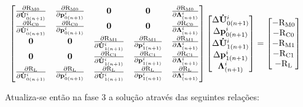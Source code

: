 \documentclass[tese_patricia]{subfiles}
\begin{document}
\begin{align}
	\begin{bmatrix}
		\frac{\partial\mathrm{R}_\mathrm{M0}}{\partial\mathbf{\dot{U}}_{0(n+1)}^{i}} & \frac{\partial\mathrm{R}_\mathrm{M0}}{\partial\mathbf{p}_{0(n+1)}^{i}} & \mathbf{0} & \mathbf{0} & \frac{\partial\mathrm{R}_\mathrm{M0}}{\partial\boldsymbol{\Lambda}_{(n+1)}^{i}} \\
		\frac{\partial\mathrm{R}_\mathrm{C0}}{\partial\mathbf{\dot{U}}_{0(n+1)}^{i}} & \frac{\partial\mathrm{R}_\mathrm{C0}}{\partial\mathbf{p}_{0(n+1)}^{i}} & \mathbf{0} & \mathbf{0} & \frac{\partial\mathrm{R}_\mathrm{C0}}{\partial\boldsymbol{\Lambda}_{(n+1)}^{i}} \\
		 \mathbf{0} & \mathbf{0} & \frac{\partial\mathrm{R}_\mathrm{M1}}{\partial\mathbf{\dot{U}}_{1(n+1)}^{i}} & \frac{\partial\mathrm{R}_\mathrm{M1}}{\partial\mathbf{p}_{1(n+1)}^{i}} & \frac{\partial\mathrm{R}_\mathrm{M1}}{\partial\boldsymbol{\Lambda}_{(n+1)}^{i}} \\
		 \mathbf{0} & \mathbf{0} & \frac{\partial\mathrm{R}_\mathrm{C1}}{\partial\mathbf{\dot{U}}_{1(n+1)}^{i}} & \frac{\partial\mathrm{R}_\mathrm{C1}}{\partial\mathbf{p}_{1(n+1)}^{i}} & \frac{\partial\mathrm{R}_\mathrm{C1}}{\partial\boldsymbol{\Lambda}_{(n+1)}^{i}} \\
		  \frac{\partial\mathrm{R}_\mathrm{L}}{\partial\mathbf{\dot{U}}_{0(n+1)}^{i}} & \frac{\partial\mathrm{R}_\mathrm{L}}{\partial\mathbf{p}_{0(n+1)}^{i}} & \frac{\partial\mathrm{R}_\mathrm{L}}{\partial\mathbf{\dot{U}}_{1(n+1)}^{i}} & \frac{\partial\mathrm{R}_\mathrm{L}}{\partial\mathbf{p}_{1(n+1)}^{i}} & \frac{\partial\mathrm{R}_\mathrm{L}}{\partial\boldsymbol{\Lambda}_{(n+1)}^{i}}
	\end{bmatrix}
	\begin{bmatrix}
		\Delta\mathbf{\dot{U}}_{0(n+1)}^{i} \\
		\Delta\mathbf{p}_{0(n+1)}^{i} \\
		\Delta\mathbf{\dot{U}}_{1(n+1)}^{i} \\
		\Delta\mathbf{p}_{1(n+1)}^{i} \\
		\boldsymbol{\Lambda}_{(n+1)}^{i}
	\end{bmatrix}
	&=
	\begin{bmatrix}
		-\mathrm{R}_\mathrm{M0} \\
		-\mathrm{R}_\mathrm{C0} \\
		-\mathrm{R}_\mathrm{M1} \\
		-\mathrm{R}_\mathrm{C1} \\
		-\mathrm{R}_\mathrm{L}
	\end{bmatrix}
	\label{eq:sistema_linear_Arlq}
\end{align}	

Atualiza-se então na fase 3 a solução através das seguintes relações:
\end{document}

